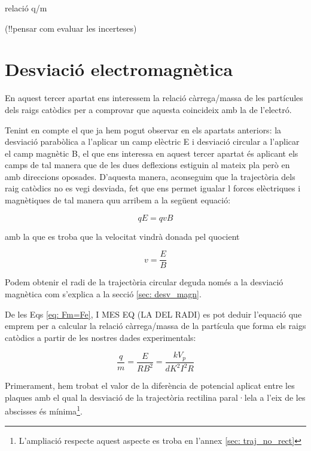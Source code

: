 \documentclass[11pt]{article}
\begin{document}
relació q/m


(!!pensar com evaluar les incerteses)

\section{Desviació electromagnètica}\label{sec: desv_em}

En aquest tercer apartat ens interessem la relació càrrega/massa de les partícules dels raigs catòdics per a comprovar que aquesta coincideix amb la de l'electró. 

Tenint en compte el que ja hem pogut observar en els apartats anteriors: la desviació parabòlica a l'aplicar un camp elèctric E i desviació circular a l'aplicar el camp magnètic B, el que ens interessa en aquest tercer apartat és aplicant els camps de tal manera que de les dues deflexions estiguin al mateix pla però en amb direccions oposades. D'aquesta manera, aconseguim que la trajectòria dels raig catòdics no es vegi desviada, fet que ens permet igualar l forces elèctriques i magnètiques de tal manera quu arribem a la següent equació:

\begin{equation}\label{eq: Fm=Fe}
    qE = qvB
\end{equation}

amb la que es troba que la velocitat vindrà donada pel quocient

\begin{equation}
    v = \frac{E}{B}
\end{equation}

Podem obtenir el radi de la trajectòria circular deguda només a la desviació magnètica com s'explica a la secció \ref{sec: desv_magn}.

De les Eqs \eqref{eq: Fm=Fe}, I MES EQ (LA DEL RADI) es pot deduir l'equació que emprem per a calcular la relació càrrega/massa de la partícula que forma els raigs catòdics a partir de les nostres dades experimentals:

\begin{equation}
    \frac{q}{m}=\frac{E}{RB^2}=\frac{kV_p}{dK^2I^2R}
\end{equation}

Primerament, hem trobat el valor de la diferència de potencial aplicat entre les plaques amb el qual la desviació de la trajectòria rectilina paral·lela a l'eix de les abscisses és mínima\footnote{L'ampliació respecte aquest aspecte es troba en l'annex \ref{sec: traj_no_rect}}. 
\end{document}
